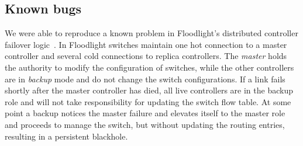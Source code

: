 \subsection{Known bugs}

%
 We were able to reproduce a
known problem in Floodlight's distributed controller failover
logic~\cite{floodlight_bug}. In Floodlight switches maintain one hot connection to a master controller and
several cold connections to replica controllers. The \emph{master} holds the
authority to modify the configuration of switches, while the other
controllers are in \emph{backup} mode and do not change the
switch configurations. %
If a link fails shortly after the master
controller has died, all live controllers are in
the backup role and will not take responsibility for updating the switch
flow table. At some point a backup notices the master failure and
elevates itself to the master role and proceeds to manage
the switch, but without updating the routing entries,
resulting in a persistent blackhole.

